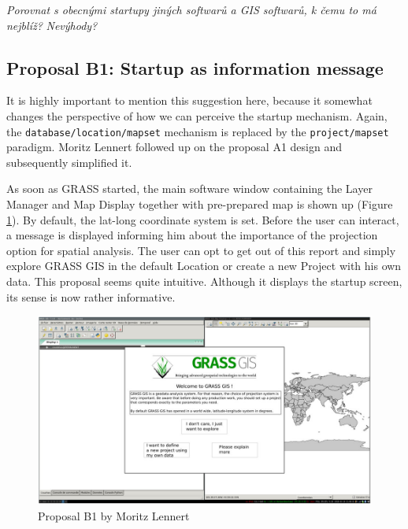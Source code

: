 \documentclass[a4paper,10pt,twoside]{article}
\begin{document}
\textit{\color{red} Porovnat s obecnými startupy jiných softwarů a GIS softwarů, k čemu to má nejblíž?}
\textit{\color{red} Nevýhody?}

\subsection{Proposal B1: Startup as information message}

It is highly important to mention this suggestion here, because it somewhat changes the perspective of how we can perceive the startup mechanism.  Again, the \texttt{database/location/mapset} mechanism is replaced by the \texttt{project/mapset} paradigm. Moritz Lennert followed up on the proposal A1 design and subsequently simplified it.

As soon as GRASS started, the main software window containing the Layer Manager and Map Display together with pre-prepared map is shown up (Figure \ref{fig:proposalB1}). By default, the lat-long coordinate system is set. Before the user can interact, a message is displayed informing him about the importance of the projection option for spatial analysis. The user can opt to get out of this report and simply explore GRASS GIS in the default Location or create a new Project with his own data. This proposal seems quite intuitive. Although it displays the startup screen, its sense is now rather informative.

\vspace{0.3cm}
\begin{figure}[hbt!] 
\begin{center}
\includegraphics[width=15cm]{pictures/proposalB1.png} 
\caption[Proposal B1 by Moritz Lennert]{Proposal B1 by Moritz Lennert}
\label{fig:proposalB1}
\end{center}
\end{figure}
\end{document}
